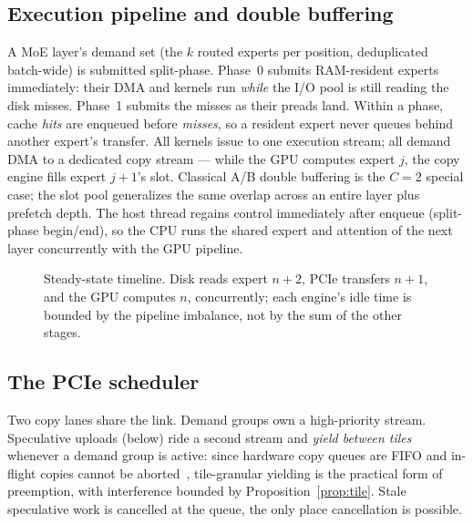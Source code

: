 \documentclass[11pt]{article}
\theoremstyle{definition}
\theoremstyle{remark}
\begin{document}
\subsection{Execution pipeline and double buffering}
A MoE layer's demand set (the $k$ routed experts per position, deduplicated
batch-wide) is submitted split-phase. Phase~0 submits RAM-resident experts
immediately: their DMA and kernels run \emph{while} the I/O pool is still
reading the disk misses. Phase~1 submits the misses as their preads land.
Within a phase, cache \emph{hits} are enqueued before \emph{misses}, so a
resident expert never queues behind another expert's transfer. All kernels
issue to one execution stream; all demand DMA to a dedicated copy stream ---
while the GPU computes expert $j$, the copy engine fills expert $j{+}1$'s
slot. Classical A/B double buffering is the $C{=}2$ special case; the slot
pool generalizes the same overlap across an entire layer plus prefetch depth.
The host thread regains control immediately after enqueue (split-phase
begin/end), so the CPU runs the shared expert and attention of the next
layer concurrently with the GPU pipeline.

\begin{figure}[t]
\centering
{}
\caption{Steady-state timeline. Disk reads expert $n{+}2$, PCIe transfers
$n{+}1$, and the GPU computes $n$, concurrently; each engine's idle time is
bounded by the pipeline imbalance, not by the sum of the other stages.}
\label{fig:timeline}
\end{figure}

\subsection{The PCIe scheduler}\label{sec:pcie}
Two copy lanes share the link. Demand groups own a high-priority stream.
Speculative uploads (below) ride a second stream and \emph{yield between
tiles} whenever a demand group is active: since hardware copy queues are
FIFO and in-flight copies cannot be aborted~\citep{nvidia2025cuda},
tile-granular yielding is the practical form of preemption, with
interference bounded by Proposition~\ref{prop:tile}. Stale speculative work
is cancelled at the queue, the only place cancellation is possible.
\end{document}
